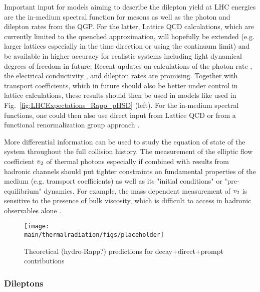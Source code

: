 \documentclass[../report.tex]{subfiles}
\providecommand{\main}{..}
\begin{document}
Important input for models aiming to describe the dilepton yield at LHC energies are the in-medium spectral function for \Prho mesons as well as the photon and dilepton rates from the QGP. For the latter, Lattice QCD calculations, which are currently limited to the quenched approximation, will hopefully be extended (e.g. larger lattices especially in the time direction or using the continuum limit) and be available in higher accuracy for realistic systems including light dynamical degrees of freedom in future. Recent updates on calculations of the photon rate \cite{Ghiglieri:2016tvj}, the electrical conductivity \cite{Aarts:2014nba}, and dilepton rates \cite{Ding:2016hua} are promising. Together with transport coefficients, which in future should also be better under control in lattice calculations, these results should then be used in models like used in Fig.~\ref{fig:LHCExpectations_Rapp_pHSD} (left). For the in-medium spectral functions, one could then also use direct input from Lattice QCD \cite{Aarts:2005hg,Brandt:2015aqk} or from a functional renormalization group approach \cite{Jung:2016yxl}.


More differential information can be used to study the equation of state of the system throughout the full collision history. The measurement of the elliptic flow coefficient $v_{\rm 2}$ of thermal photons especially if combined with results from hadronic channels should put tighter constraints on fundamental properties of the medium (e.g. transport coefficients) as well as its "initial conditions" or "pre-equilibrium" dynamics. For example, the mass dependent measurement of  $v_{\rm 2}$ is sensitive to the presence of bulk viscosity, which is difficult to access in hadronic observables alone \cite{Vujanovic:2017wtw}\cite{newerpublication}. 

\begin{figure}[htb]
\centering
\texttt{[image: \\main/thermalradiation/figs/placeholder]}
\caption{Theoretical (hydro-Rapp?) predictions for decay+direct+prompt contributions}
\label{fig:LHCExpectations_RealPhotons}
\end{figure}


\newpage


\newpage
\subsubsection{Dileptons}
\label{sec:thermalradiation:dileptons}
\end{document}
